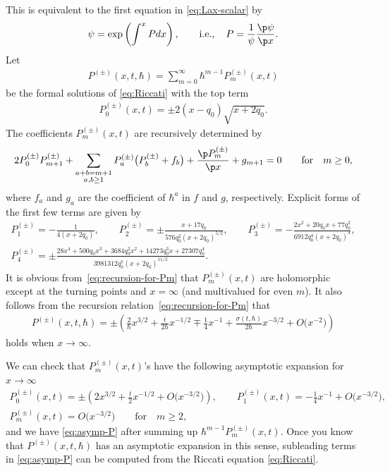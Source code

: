 This is equivalent to the f\/irst equation
in \eqref{eq:Lax-scalar} by
\begin{gather*}
\psi = \exp\left( \int^{x} Pdx \right), \qquad
 \text{i.e.}, \quad P = \frac{1}{\psi} \frac{\p \psi}{\p x}  .
\end{gather*}
Let
\begin{gather*}
P^{(\pm)}(x,t,\hbar) = \sum_{m=0}^{\infty}\hbar^{m-1}P^{(\pm)}_{m}(x,t)
\end{gather*}
be the formal solutions of \eqref{eq:Riccati} with the top term
\begin{gather*} %
P^{(\pm)}_{0}(x,t) = \pm 2(x-q_{0})\sqrt{x+2q_{0}}.
\end{gather*}
The coef\/f\/icients $P^{(\pm)}_{m}(x,t)$ are recursively determined by
\begin{gather} \label{eq:recursion-for-Pm}
2P^{(\pm)}_{0}P^{(\pm)}_{m+1} +
\sum_{\substack{a+b=m+1 \\ a,b \ge 1}}
P^{(\pm)}_{a} \big(P^{(\pm)}_{b} + f_{b}\big) +
\frac{\p P^{(\pm)}_{m}}{\p x} + g_{m+1} = 0 \qquad \text{for} \quad m \ge 0,
\end{gather}
where $f_{a}$ and $g_{a}$ are the coef\/f\/icient of $\hbar^{a}$
in $f$ and $g$, respectively. Explicit forms of the f\/irst few terms
are given by
\begin{gather*}
P^{(\pm)}_{1}   =   -\frac{1}{4(x+2q_{0})}, \qquad
P^{(\pm)}_{2}   =   \pm \frac{x+17q_{0}}{576q_{0}^{2}(x+2q_{0})^{5/2}}, \qquad
P^{(\pm)}_{3}   =   -\frac{2x^{2}+20q_{0}x+77q_{0}^{2}}
{6912q_{0}^{4}(x+2q_{0})^{4}}, \\
P^{(\pm)}_{4}   =   \pm \frac{28x^{4}+500q_{0}x^{3}+
3684q_{0}^{2}x^{2}+14273q_{0}^{3}x+27307q_{0}^{4}}
{3981312 q_{0}^{7}(x+2q_{0})^{11/2}}.
\end{gather*}
It is obvious from~\eqref{eq:recursion-for-Pm}
that $P^{(\pm)}_{m}(x,t)$ are holomorphic except
at the turning points and $x = \infty$
(and multivalued for even $m$).
It also follows from the recursion relation~\eqref{eq:recursion-for-Pm} that
\begin{gather} \label{eq:asymp-P}
P^{(\pm)}(x,t,\hbar)
= \pm \left(\frac{2}{\hbar}x^{3/2} + \frac{t}{2\hbar}x^{-1/2}
\mp \frac{1}{4}x^{-1} + \frac{\sigma(t,\hbar)}{2\hbar} x^{-3/2}
+ O\big(x^{-2}\big) \right)
\end{gather}
holds when $x \rightarrow \infty$.

\begin{rem} \label{rem:asymptotics}
We can check that $P^{(\pm)}_{m}(x,t)$'s
have the following asymptotic expansion for \mbox{$x \rightarrow \infty$}
\begin{gather*}
P^{(\pm)}_{0}(x,t)   =   \pm \left( 2x^{3/2} + \frac{t}{2}x^{-1/2}
+ O\big(x^{-3/2}\big) \right), \qquad
P^{(\pm)}_{1}(x,t)  =   -\frac{1}{4}x^{-1} + O\big(x^{-3/2}\big), \\
P^{(\pm)}_{m}(x,t)   =    O\big(x^{-3/2}\big) \qquad \text{for} \quad m \ge 2,
\end{gather*}
and we have \eqref{eq:asymp-P} after summing up
$\hbar^{m-1}P^{(\pm)}_{m}(x,t)$. Once you know that $P^{(\pm)}(x,t,\hbar)$
has an asymptotic expansion in this sense, subleading terms in
\eqref{eq:asymp-P} can be computed from
the Riccati equation \eqref{eq:Riccati}.
\end{rem}

